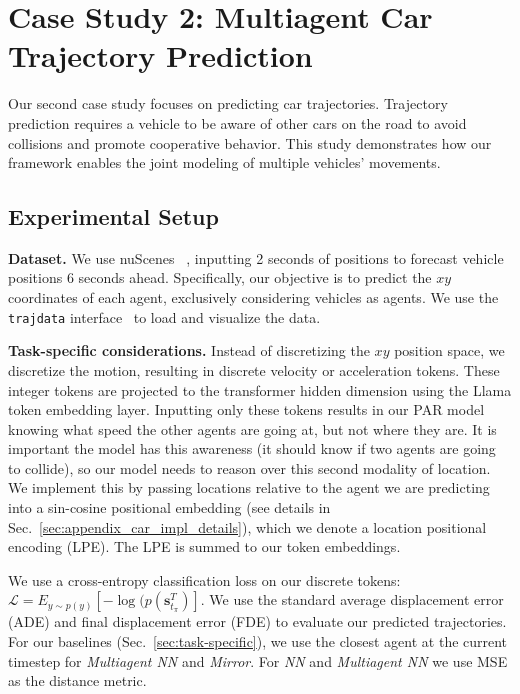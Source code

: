 \section{Case Study 2: Multiagent Car Trajectory Prediction}
\label{sec:car_trajs}
Our second case study focuses on predicting car trajectories. Trajectory prediction requires a vehicle to be aware of other cars on the road to avoid collisions and promote cooperative behavior. This study demonstrates how our framework enables the joint modeling of multiple vehicles' movements.

\subsection{Experimental Setup}
\noindent \textbf{Dataset.} We use nuScenes~\citep{nuscenes} , inputting 2 seconds of positions to forecast vehicle positions 6 seconds ahead. Specifically, our objective is to predict the $xy$ coordinates of each agent, exclusively considering vehicles as agents. We use the \texttt{trajdata} interface~\citep{ivanovic2023trajdata} to load and visualize the data.

\noindent \textbf{Task-specific considerations.}   Instead of discretizing the $xy$ position space, we discretize the motion, resulting in discrete velocity or acceleration tokens. These integer tokens are projected to the transformer hidden dimension using the Llama token embedding layer. Inputting only these tokens results in our PAR model knowing what speed the other agents are going at, but not where they are. It is important the model has this awareness (it should know if two agents are going to collide), so our model needs to reason over this second modality of location. We implement this by passing locations relative to the agent we are predicting into a sin-cosine positional embedding (see details in Sec.~\ref{sec:appendix_car_impl_details}), which we denote a location positional encoding (LPE). The LPE is summed to our token embeddings.

We use a cross-entropy classification loss on our discrete tokens:
$\mathscr{L} = E_{y \sim p(y)}[-\log(p(\mathbf{s}^{T}_{t_{\pi}})].$  We use the standard average displacement error (ADE) and final displacement error (FDE) to evaluate our predicted trajectories. For our baselines (Sec.~\ref{sec:task-specific}), we use the closest agent at the current timestep for \textit{Multiagent NN} and \textit{Mirror}. For \textit{NN} and \textit{Multiagent NN} we use MSE as the distance metric.



